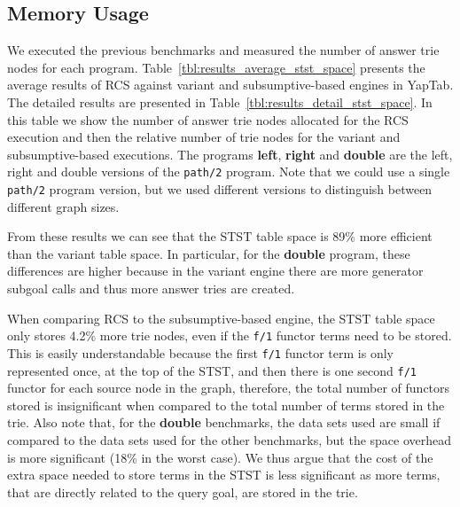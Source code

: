 

\subsection{Memory Usage}

We executed the previous benchmarks and measured the number of answer trie nodes for each program.
Table~\ref{tbl:results_average_stst_space} presents the average results of RCS against variant and
subsumptive-based engines in YapTab. The detailed results are presented in Table~\ref{tbl:results_detail_stst_space}.
In this table we show the number of answer trie nodes allocated for the RCS execution and then the relative number
of trie nodes for the variant and subsumptive-based executions.
The programs \textbf{left}, \textbf{right} and \textbf{double} are the left, right and double versions
of the \texttt{path/2} program. Note that we could use a single \texttt{path/2} program version, but
we used different versions to distinguish between different graph sizes.

From these results we can see that the STST table space is 89\% more efficient
than the variant table space. In particular, for the \textbf{double} program, these differences are higher
because in the variant engine there are more generator subgoal calls and thus more answer tries are created.

When comparing RCS to the subsumptive-based engine, the STST table space only stores 4.2\% more trie nodes,
even if the \texttt{f/1} functor terms need to be stored. This is easily understandable because
the first \texttt{f/1} functor term is only represented once, at the top of the STST, and then there is one
second \texttt{f/1} functor
for each source node in the graph, therefore, the total number of functors stored is insignificant when
compared to the total number of terms stored in the trie. Also note that, for the \textbf{double} benchmarks,
the data sets used are small if compared to the data sets used for the other benchmarks, but the space overhead
is more significant (18\% in the worst case). We thus argue that the cost of
the extra space needed to store terms in the STST is less significant as more terms,
that are directly related to the query goal, are stored in the trie.


